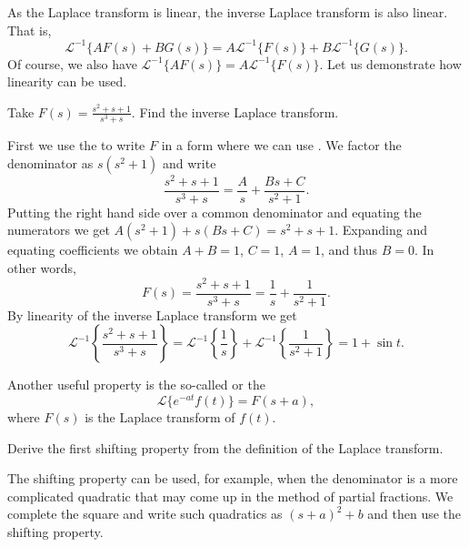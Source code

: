 \documentclass[12pt]{book}
\begin{document}
As the Laplace transform is linear, the inverse Laplace
transform is also linear.  That is,
\begin{equation*}
{\mathcal{L}}^{-1} \{ A F(s) + B G(s) \} =
A {\mathcal{L}}^{-1} \{ F(s) \} +
B {\mathcal{L}}^{-1} \{ G(s) \} .
\end{equation*}
Of course, we also have
${\mathcal{L}}^{-1} \{ A F(s) \} = A {\mathcal{L}}^{-1} \{ F(s) \}$.
Let us demonstrate how linearity can be used.

\begin{example}
Take
$F(s) = \frac{s^2+s+1}{s^3+s}$.  Find the inverse Laplace transform.

First we use the \emph{} to write $F$ in a form where
we can use .  We factor the denominator as
$s(s^2+1)$ and write
\begin{equation*}
\frac{s^2+s+1}{s^3+s}
=
\frac{A}{s} + 
\frac{Bs+C}{s^2+1} .
\end{equation*}
Putting the right hand side over a common
denominator and equating the numerators we get
$A(s^2+1) + s(Bs+C) = s^2+s+1$.  Expanding and equating coefficients
we obtain $A+B = 1$, $C=1$, $A=1$,
and thus $B=0$.  In
other words,
\begin{equation*}
F(s) =
\frac{s^2+s+1}{s^3+s}
=
\frac{1}{s} +
\frac{1}{s^2+1} .
\end{equation*}
By linearity of the inverse Laplace transform we get 
\begin{equation*}
{\mathcal{L}}^{-1} \left\{ 
\frac{s^2+s+1}{s^3+s} \right\}
=
{\mathcal{L}}^{-1} \left\{ 
\frac{1}{s} \right\} 
+
{\mathcal{L}}^{-1} \left\{ 
\frac{1}{s^2+1} \right\}
=
1 + 
\sin t .
\end{equation*}
\end{example}

Another useful property is the 
so-called \emph{} or
the \emph{}
\begin{equation*}
\boxed{~~
\mathcal{L} \{ e^{-at} f(t) \} = F(s+a) ,
~~}
\end{equation*}
where $F(s)$ is the Laplace transform of $f(t)$.

\begin{exercise}
Derive the first shifting property
from the definition of the Laplace transform.
\end{exercise}

The shifting property can be used, for example, when the denominator is a
more complicated quadratic that may come up in the method of partial
fractions.  We complete the square and write such quadratics as ${(s+a)}^2+b$
and then use the shifting property.
\end{document}

